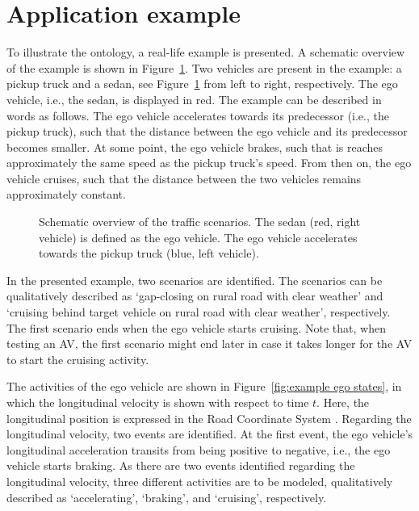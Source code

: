 \section{Application example}
\label{sec:example}

To illustrate the ontology, a real-life example is presented. A schematic overview of the example is shown in Figure~\ref{fig:example schematic}. Two vehicles are present in the example: a pickup truck and a sedan, see Figure~\ref{fig:example schematic} from left to right, respectively. The ego vehicle, i.e., the sedan, is displayed in red. The example can be described in words as follows. The ego vehicle accelerates towards its predecessor (i.e., the pickup truck), such that the distance between the ego vehicle and its predecessor becomes smaller. At some point, the ego vehicle brakes, such that is reaches approximately the same speed as the pickup truck's speed. From then on, the ego vehicle cruises, such that the distance between the two vehicles remains approximately constant.

\begin{figure}
	\centering
	\setlength\figureheight{121pt}
	\setlength\figurewidth{260pt}
	
	\caption{Schematic overview of the traffic scenarios. The sedan (red, right vehicle) is defined as the ego vehicle. The ego vehicle accelerates towards the pickup truck (blue, left vehicle).}
	\label{fig:example schematic}
\end{figure}

In the presented example, two scenarios are identified. The scenarios can be qualitatively described as `gap-closing on rural road with clear weather' and `cruising behind target vehicle on rural road with clear weather', respectively. The first scenario ends when the ego vehicle starts cruising. Note that, when testing an AV, the first scenario might end later in case it takes longer for the AV to start the cruising activity.

The activities of the ego vehicle are shown in Figure~\ref{fig:example ego states}, in which the longitudinal velocity is shown with respect to time $t$. Here, the longitudinal position is expressed in the Road Coordinate System \cite{zofka2015datadrivetrafficscenarios}. Regarding the longitudinal velocity, two events are identified. At the first event, the ego vehicle's longitudinal acceleration transits from being positive to negative, i.e., the ego vehicle starts braking. As there are two events identified regarding the longitudinal velocity, three different activities are to be modeled, qualitatively described as `accelerating', `braking', and `cruising', respectively. 

